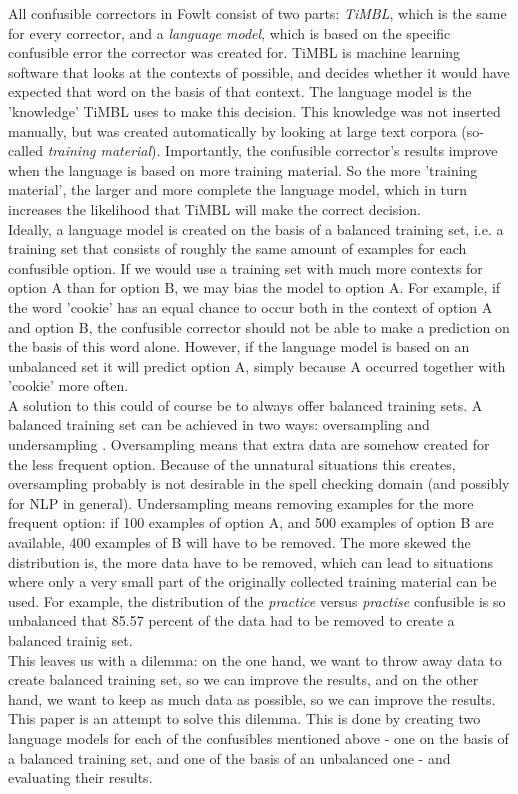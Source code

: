 \documentclass[12pt]{article}
\begin{document}
All confusible correctors in Fowlt consist of two parts: \emph{TiMBL}, which is the same for every corrector, and a \emph{language model}, which is based on the specific confusible error the corrector was created for. TiMBL is machine learning software that looks at the contexts of possible, and decides whether it would have expected that word on the basis of that context. The language model is the 'knowledge' TiMBL uses to make this decision. This knowledge was not inserted manually, but was created automatically by looking at large text corpora (so-called \emph{training material}). Importantly, the confusible corrector's results improve when the language is based on more training material. So the more 'training material', the larger and more complete the language model, which in turn increases the likelihood that TiMBL will make the correct decision. \\\indent
Ideally, a language model is created on the basis of a balanced training set, i.e. a training set that consists of roughly the same amount of examples for each confusible option. If we would use a training set with much more contexts for option A than for option B, we may bias the model to option A. For example, if the word 'cookie' has an equal chance to occur both in the context of option A and option B, the confusible corrector should not be able to make a prediction on the basis of this word alone. However, if the language model is based on an unbalanced set it will predict option A, simply because A occurred together with 'cookie' more often. \\\indent
A solution to this could of course be to always offer balanced training sets. A balanced training set can be achieved in two ways: oversampling and undersampling \citep{provost, gh09}. Oversampling means that extra data are somehow created for the less frequent option. Because of the unnatural situations this creates, oversampling probably is not desirable in the spell checking domain (and possibly for NLP in general). Undersampling means removing examples for the more frequent option: if 100 examples of option A, and 500 examples of option B are available, 400 examples of B will have to be removed. The more skewed the distribution is, the more data have to be removed, which can lead to situations where only a very small part of the originally collected training material can be used. For example, the distribution of the \emph{practice} versus \emph{practise} confusible is so unbalanced that 85.57 percent of the data had to be removed to create a balanced trainig set. \\\indent
This leaves us with a dilemma: on the one hand, we want to throw away data to create balanced training set, so we can improve the results, and on the other hand, we want to keep as much data as possible, so we can improve the results. This paper is an attempt to solve this dilemma. This is done by creating two language models for each of the confusibles mentioned above - one on the basis of a balanced training set, and one of the basis of an unbalanced one - and evaluating their results.
\end{document}
